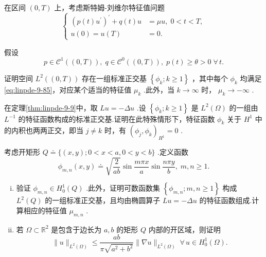 \begin{rbhw}
在区间 $\left(  {0,T}\right)$ 上，考虑斯特姆-刘维尔特征值问题
\begin{equation}\tag{9.85}\label{eq:linpde-9-85}
\begin{cases} {\left( p\left( t\right) {u}^{\prime }\right) }^{\prime } + q\left( t\right) u &  = {\mu u},\;0 < t < T, \\  u\left( 0\right)  = u\left( T\right) &  = 0. \end{cases}
\end{equation}

假设
\[
p \in  {\mathcal{C}}^{1}\left( {( 0,T) }\right) ,\;q \in  {\mathcal{C}}^{0}\left( \left(  {0,T}\right)  \right) ,\;p\left( t\right)  \geq  \theta  > 0\;\forall\,t.
\]

证明空间 ${L}^{2}\left( \left(  {0,T}\right)  \right)$ 存在一组标准正交基 $\left\{  {{\phi }_{k};k \geq  1}\right\}$ ，其中每个 ${\phi }_{k}$ 均满足\eqref{eq:linpde-9-85}，对应某个适当的特征值 ${\mu }_{k}$ .此外，当 $k \rightarrow  \infty$ 时， ${\mu }_{k} \rightarrow   - \infty$ .

\end{rbhw}

\begin{rbhw}
在定理\ref{thm:linpde-9-9}中，取 ${Lu} =  - {\Delta u}$ .设 $\left\{  {{\phi }_{k};k \geq  1}\right\}$ 是 ${L}^{2}\left( \Omega \right)$ 的一组由 ${L}^{-1}$ 的特征函数构成的标准正交基.证明在此特殊情形下，特征函数 ${\phi }_{k}$ 关于 ${H}^{1}$ 中的内积也两两正交，即当 $j \neq  k$ 时，有 ${\left( {\phi }_{j},{\phi }_{k}\right) }_{{H}^{1}} = 0$ .

\end{rbhw}

\begin{rbhw}
考虑开矩形 $Q \doteq  \{ \left( {x,y}\right) ;0 < x < a,0 < y < b\}$ .定义函数
\[
{\phi }_{m,n}\left( {x,y}\right)  \doteq  \sqrt{\frac{2}{ab}}\sin \frac{m\pi x}{a}\sin \frac{n\pi y}{b},\;m,n \geq  1.
\]
\begin{enumerate}[(i)]
    \item 验证 ${\phi }_{m,n} \in  {H}_{0}^{1}\left( Q\right)$ .此外，证明可数函数集 $\left\{  {{\phi }_{m,n};m,n \geq  1}\right\}$ 构成 ${L}^{2}\left( Q\right)$ 的一组标准正交基，且均由椭圆算子 ${Lu} =  - {\Delta u}$ 的特征函数组成.计算相应的特征值 ${\mu }_{m,n}$ .
    \item 若 $\Omega  \subset  {\mathbb{R}}^{2}$ 是包含于边长为 $a,b$ 的矩形 $Q$ 内部的开区域，则证明
\[
\| u{\| }_{{L}^{2}\left( \Omega \right) } \leq  \frac{ab}{\pi \sqrt{{a}^{2} + {b}^{2}}}\| \nabla u{\| }_{{L}^{2}\left( \Omega \right) }\;\forall\,u \in  {H}_{0}^{1}\left( \Omega \right) .
\]
\end{enumerate}
\end{rbhw}

